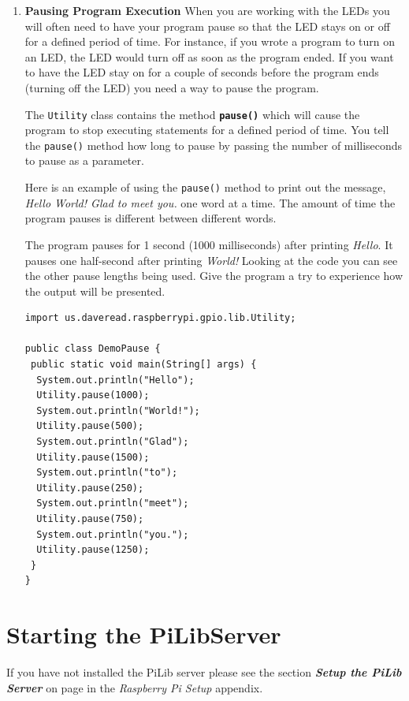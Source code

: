 \begin{enumerate}
	\item \textbf{Pausing Program Execution} \newline
	When you are working with the LEDs you will often need to have your program pause so that the LED stays on or off for a defined period of time. For instance, if you wrote a program to turn on an LED, the LED would turn off as soon as the program ended. If you want to have the LED stay on for a couple of seconds before the program ends (turning off the LED) you need a way to pause the program.
	
	The \texttt{Utility} class contains the method \textbf{\texttt{pause()}} which will cause the program to stop executing statements for a defined period of time. You tell the \texttt{pause()} method how long to pause by passing the number of milliseconds to pause as a parameter.
	
	Here is an example of using the \texttt{pause()} method to print out the message, \textit{Hello World! Glad to meet you.} one word at a time. The amount of time the program pauses is different between different words.
	
	The program pauses for 1 second (1000 milliseconds) after printing \textit{Hello}. It pauses one half-second after printing \textit{World!} Looking at the code you can see the other pause lengths being used. Give the program a try to experience how the output will be presented.
	
\beforeverb
\begin{verbatim}
import us.daveread.raspberrypi.gpio.lib.Utility;

public class DemoPause {
 public static void main(String[] args) {
  System.out.println("Hello");
  Utility.pause(1000);
  System.out.println("World!");
  Utility.pause(500);
  System.out.println("Glad");
  Utility.pause(1500);
  System.out.println("to");
  Utility.pause(250);
  System.out.println("meet");
  Utility.pause(750);
  System.out.println("you.");
  Utility.pause(1250);    
 }
}\end{verbatim}
\afterverb
	
\end{enumerate}

\section{Starting the PiLibServer}

If you have not installed the PiLib server please see the section \textbf{\textit{Setup the PiLib Server}} on page \pageref{setupPiLibServer} in the \textit{Raspberry Pi Setup} appendix.

